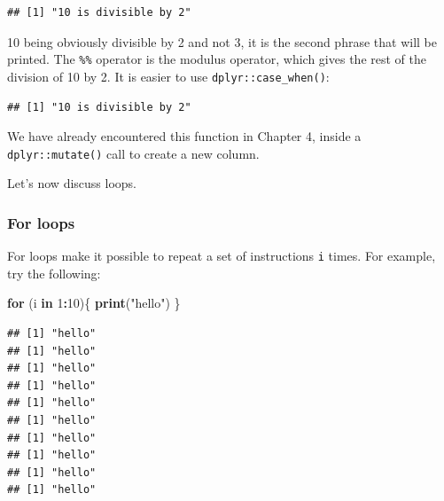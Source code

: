 \documentclass[]{gitbook}
\newenvironment{Shaded}{\begin{snugshade}}{\end{snugshade}}
\newcommand{\ControlFlowTok}[1]{\textcolor[rgb]{0.13,0.29,0.53}{\textbf{#1}}}
\newcommand{\DecValTok}[1]{\textcolor[rgb]{0.00,0.00,0.81}{#1}}
\newcommand{\KeywordTok}[1]{\textcolor[rgb]{0.13,0.29,0.53}{\textbf{#1}}}
\newcommand{\NormalTok}[1]{#1}
\newcommand{\OperatorTok}[1]{\textcolor[rgb]{0.81,0.36,0.00}{\textbf{#1}}}
\newcommand{\StringTok}[1]{\textcolor[rgb]{0.31,0.60,0.02}{#1}}
\begin{document}
\begin{verbatim}
## [1] "10 is divisible by 2"
\end{verbatim}

10 being obviously divisible by 2 and not 3, it is the second phrase that will be printed. The
\texttt{\%\%} operator is the modulus operator, which gives the rest of the division of 10 by 2.
It is easier to use \texttt{dplyr::case\_when()}:

\begin{Shaded}
\end{Shaded}

\begin{verbatim}
## [1] "10 is divisible by 2"
\end{verbatim}

We have already encountered this function in Chapter 4, inside a \texttt{dplyr::mutate()} call to create a new column.

Let's now discuss loops.

\hypertarget{for-loops}{%
\subsubsection{For loops}\label{for-loops}}

For loops make it possible to repeat a set of instructions \texttt{i} times. For example, try the following:

\begin{Shaded}
\begin{Highlighting}[]
\ControlFlowTok{for}\NormalTok{ (i }\ControlFlowTok{in} \DecValTok{1}\OperatorTok{:}\DecValTok{10}\NormalTok{)\{}
  \KeywordTok{print}\NormalTok{(}\StringTok{"hello"}\NormalTok{)}
\NormalTok{\}}
\end{Highlighting}
\end{Shaded}

\begin{verbatim}
## [1] "hello"
## [1] "hello"
## [1] "hello"
## [1] "hello"
## [1] "hello"
## [1] "hello"
## [1] "hello"
## [1] "hello"
## [1] "hello"
## [1] "hello"
\end{verbatim}
\end{document}
